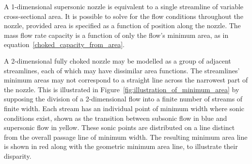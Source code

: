 \documentclass[a4paper, 11pt, oneside]{report}
\begin{document}




A 1-dimensional supersonic nozzle is equivalent to a single streamline of variable cross-sectional area. It is possible to solve for the flow conditions throughout the nozzle, provided area is specified as a function of position along the nozzle. The mass flow rate capacity is a function of only the flow's minimum area, as in equation~\ref{choked_capacity_from_area}.

A 2-dimensional fully choked nozzle may be modelled as a group of adjacent streamlines, each of which may have dissimilar area functions. The streamlines' minimum areas may not correspond to a straight line across the narrowest part of the nozzle. This is illustrated in Figure~\ref{fig:illustration_of_minimum_area} by supposing the division of a 2-dimensional flow into a finite number of streams of finite width. Each stream has an individual point of minimum width where sonic conditions exist, shown as the transition between subsonic flow in blue and supersonic flow in yellow. These sonic points are distributed on a line distinct from the overall passage line of minimum width. The resulting minimum area line is shown in red along with the geometric minimum area line, to illustrate their disparity.
\end{document}
